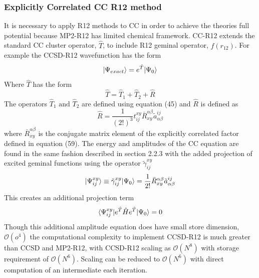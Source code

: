     \subsubsection{Explicitly Correlated CC R12 method}
      It is necessary to apply R12 methods to CC in order to achieve the theories full potential because MP2-R12 has limited chemical framework\cite{kong 2012}.  CC-R12 extends the standard CC cluster operator, $\hat{T}$, to include R12 geminal operator, $f(r_{12})$\cite{Noga 1992, Noga 1994}.  For example the CCSD-R12 wavefunction has the form 
        \begin{equation}
          | \Psi_{exact} \rangle = e^{\hat{T}}| \Psi_0 \rangle
        \end{equation}
      Where $\hat{T}$ has the form
        \begin{equation}
          \hat{T} = \hat{T}_1 + \hat{T}_2 + \hat{R}
        \end{equation}
      The operators $\hat{T}_1 \text{ and } \hat{T}_2$ are defined using equation (45) and $\hat{R}$ is defined as 
        \begin{equation}
          \hat{R} = \frac{1}{(2!)^3} t^{xy}_{ij} \bar{R}^{\alpha \beta}_{xy} \tilde{a}^{ij}_{\alpha \beta}
        \end{equation}
      where $\bar{R}^{\alpha \beta}_{xy}$ is the conjugate matrix element of the explicitly correlated factor defined in equation (59).
      The energy and amplitudes of the CC equation are found in the same fashion described in section 2.2.3 with the added projection of excited geminal functions using the operator $\tilde{\gamma}^{xy}_{ij}$
        \begin{equation}
          | \Psi^{xy}_{ij} \rangle \equiv \tilde{\gamma}^{xy}_{ij}| \Psi_0 \rangle = \frac{1}{2!} \bar{R}^{\alpha \beta}_{xy} \tilde{a}^{ij}_{\alpha \beta}
        \end{equation}
      This creates an additional projection term
        \begin{equation}
          \langle\Psi^{xy}_{ij} | e^{\hat{T}} \hat{H} e^{\hat{T}} | \Psi_0 \rangle = 0
        \end{equation}
      Though this additional amplitude equation does have small store dimension, $\mathcal{O}(o^4)$ the computational complexity to implement CCSD-R12 is much greater than CCSD and MP2-R12, with CCSD-R12 scaling as $\mathcal{O}(N^8)$ with storage requirement of $\mathcal{O}(N^6)$.  Scaling can be reduced to $\mathcal{O}(N^6)$ with direct computation of an intermediate each iteration.\cite{Kong 2012} 